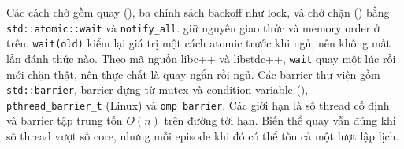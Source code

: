 Các cách chờ gồm quay (), ba chính sách backoff như lock, và chờ chặn () bằng
\texttt{std::atomic::wait} và \texttt{notify\_all}.  giữ nguyên giao thức và memory order
ở trên. \texttt{wait(old)} kiểm lại giá trị một cách atomic trước khi ngủ, nên không mất lần đánh thức nào.
Theo mã nguồn libc++ và libstdc++, \texttt{wait} quay một lúc rồi mới chặn thật, nên 
thực chất là quay ngắn rồi ngủ.
Các barrier thư viện gồm \texttt{std::barrier},
barrier dựng từ mutex và condition variable (), \texttt{pthread\_barrier\_t} (Linux) và
\texttt{omp barrier}. Các giới hạn là số thread cố định và barrier tập trung tốn $O(n)$ trên đường tới hạn. Biến thể quay
vẫn đúng khi số thread vượt số core, nhưng mỗi episode khi đó có thể tốn cả một lượt lập lịch.

